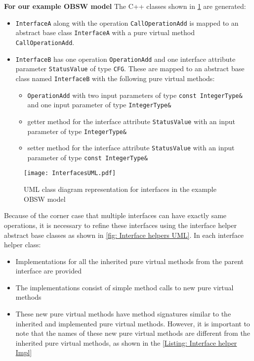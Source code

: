 \textbf{For our example OBSW model} The C++ classes shown in \cref{fig: InterfacesUML} are generated:
\begin{itemize}
\item \texttt{InterfaceA} along with the operation \texttt{CallOperationAdd} is mapped to an abstract base class \texttt{InterfaceA} with a pure virtual method \texttt{CallOperationAdd}. 
\item \texttt{InterfaceB} has one operation \texttt{OperationAdd} and one interface attribute parameter \texttt{StatusValue} of type \texttt{CFG}. These are mapped to an abstract base class named \texttt{InterfaceB} with the following pure virtual methods:
\begin{itemize}
\item \texttt{OperationAdd} with two input parameters of type \texttt{const\allowbreak \ IntegerType\&} and one input parameter of type \texttt{IntegerType\&}
\item getter method for the interface attribute \texttt{StatusValue} with an input parameter of type \texttt{IntegerType\&}
\item setter method for the interface attribute \texttt{StatusValue} with an input parameter of type \texttt{const\allowbreak \ IntegerType\&}
\end{itemize} 
\end{itemize}

\begin{figure}[h]
	\centering
	\texttt{[image: InterfacesUML.pdf]}
	\caption{UML class diagram representation for interfaces in the example OBSW model}
	\label{fig: InterfacesUML}
\end{figure}

Because of the corner case that multiple interfaces can have exactly same operations, it is necessary to refine these interfaces using the interface helper abstract base classes as shown in \cref{fig: Interface helpers UML}. In each interface helper class:
\begin{itemize}
\item Implementations for all the inherited pure virtual methods from the parent interface are provided
\item The implementations consist of simple method calls to new pure virtual methods
\item These new pure virtual methods have method signatures similar to the inherited and implemented pure virtual methods. However, it is important to note that the names of these new pure virtual methods are different from the inherited pure virtual methods, as shown in the \cref{Listing: Interface helper Impl} 
\end{itemize}

